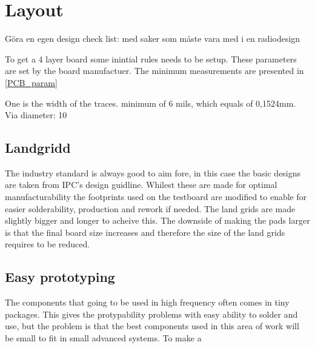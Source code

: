 \section{Layout}
Göra en egen design check list: med saker som måste vara med i en radiodesign 

To get a 4 layer board some inintial rules needs to be setup. These parameters are set by the board manufactuer. The minimum measurements are presented in \autoref{PCB_param}

One is the width of the traces. minimum of 6 mils, which equals of 0,1524mm. 
Via diameter: 10
 
\subsection{Landgridd}
The industry standard is always good to aim fore, in this case the basic designs are taken from IPC's design guidline\cite{IPC}. Whilest these are made for optimal manufacturability the footprints used on the testboard are modified to enable for easier solderability, production and rework if needed. The land grids are made slightly bigger and longer to acheive this. The downside of making the pads larger is that the final board size increases and therefore the size of the land grids requires to be reduced.

\subsection{Easy prototyping}
The components that going to be used in high frequency often comes in tiny packages. This gives the protypability problems with easy ability to solder and use, but the problem is that the best components used in this area of work will be small to fit in small advanced systems. To make a